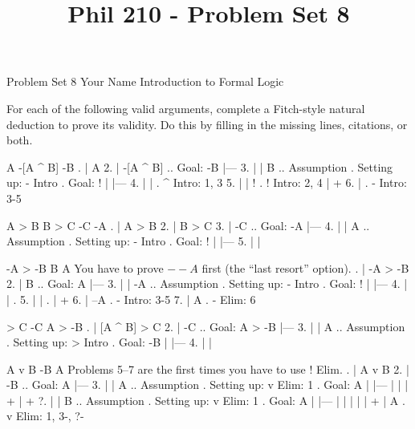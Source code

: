 
\title{Phil 210 - Problem Set 8}

\heading
Problem Set 8
Your Name
Introduction to Formal Logic
\endheading

For each of the following valid arguments, complete a Fitch-style natural deduction to prove its validity. Do this by filling in the missing lines, citations, or both.

\problems
{}
\argument
 A
 -[A ^ B]
\argumentline
 -B
\endargument
        \answer
        . | A
         2. | -[A ^ B]   ..  Goal: -B
            |---
         3. |   | B      ..  Assumption  .  Setting up: - Intro  .  Goal: !
            |   |---
         4. |   |        .  ^ Intro: 1, 3
         5. |   | !      .  ! Intro: 2, 4
            |   +
         6. |            .  - Intro: 3-5
        \endfitchproof
        \endanswer

\argument
 A > B
 B > C
 -C
\argumentline
 -A
\endargument
        \answer
        . | A > B
         2. | B > C
         3. | -C      ..  Goal: -A
            |---
         4. |   | A   ..  Assumption  .  Setting up: - Intro  .  Goal: !
            |   |---
         5. |   | 
        \endfitchproof
        \endanswer

\argument
 -A > -B
 B
\argumentline
 A
\endargument
\Hint You have to prove $--A$ first (the ``last resort'' option).
        \answer
        . | -A > -B
         2. | B        ..  Goal: A
            |---
         3. |   | -A   ..  Assumption  .  Setting up: - Intro  .  Goal: !
            |   |---
         4. |   |      .  
         5. |   |      .  
            |   +
         6. | --A      .  - Intro: 3-5
         7. | A        .  - Elim: 6
        \endfitchproof
        \endanswer

\argument
 [A ^ B] > C
 -C
\argumentline
 A > -B
\endargument
        \answer
        . | [A ^ B] > C
         2. | -C            .. Goal: A > -B
            |---
         3. |   | A         ..  Assumption  .  Setting up: > Intro  .  Goal: -B
            |   |---
         4. |   | 
        \endfitchproof
        \endanswer

\widerfitchsetup
{}
\argument
 A v B
 -B
\argumentline
 A
\endargument
\Hint Problems 5--7 are the first times you have to use $!$ Elim.
        \answer
        . | A v B
         2. | -B      ..  Goal: A
            |---
         3. |   | A   ..  Assumption  .  Setting up: v Elim: 1  .  Goal: A
            |   |---
            |   | 
            |   +
            |   +
         ?. |   | B   ..  Assumption  .  Setting up: v Elim: 1  .  Goal: A
            |   |---
            |   | 
            |   | 
            |   +
            | A       .  v Elim: 1, 3-, ?-
        \endfitchproof
        \endanswer

